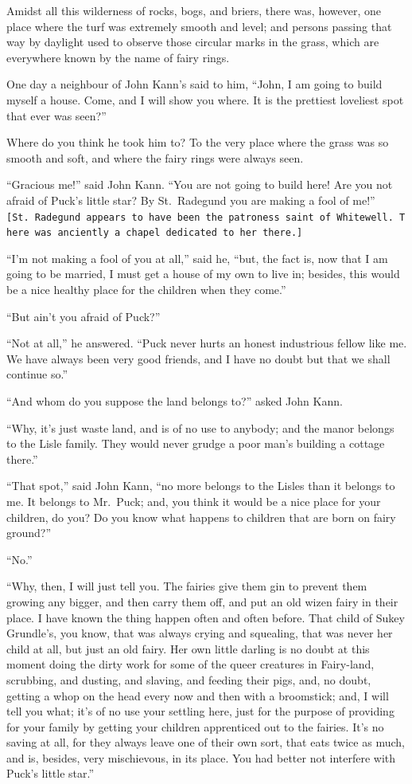 \documentclass[
  12pt,
  a5paper,
  twoside]{book}
\let\oldtexttt\texttt        %
\renewcommand{\texttt}[1]{{\footnotesize\oldtexttt{#1}}}
\begin{document}
Amidst all this wilderness of rocks, bogs, and briers, there was,
however, one place where the turf was extremely smooth and level; and
persons passing that way by daylight used to observe those circular
marks in the grass, which are everywhere known by the name of fairy
rings.

One day a neighbour of John Kann's said to him, ``John, I am going to
build myself a house. Come, and I will show you where. It is the
prettiest loveliest spot that ever was seen?''

Where do you think he took him to? To the very place where the grass was
so smooth and soft, and where the fairy rings were always seen.

``Gracious me!'' said John Kann. ``You are not going to build here! Are
you not afraid of Puck's little star? By St.~Radegund you are making a
fool of me!''
\texttt{{[}St.\ Radegund\ appears\ to\ have\ been\ the\ patroness\ saint\ of\ Whitewell.\ There\ was\ anciently\ a\ chapel\ dedicated\ to\ her\ there.{]}}

``I'm not making a fool of you at all,'' said he, ``but, the fact is,
now that I am going to be married, I must get a house of my own to live
in; besides, this would be a nice healthy place for the children when
they come.''

``But ain't you afraid of Puck?''

``Not at all,'' he answered. ``Puck never hurts an honest industrious
fellow like me. We have always been very good friends, and I have no
doubt but that we shall continue so.''

``And whom do you suppose the land belongs to?'' asked John Kann.

``Why, it's just waste land, and is of no use to anybody; and the manor
belongs to the Lisle family. They would never grudge a poor man's
building a cottage there.''

``That spot,'' said John Kann, ``no more belongs to the Lisles than it
belongs to me. It belongs to Mr.~Puck; and, you think it would be a nice
place for your children, do you? Do you know what happens to children
that are born on fairy ground?''

``No.''

``Why, then, I will just tell you. The fairies give them gin to prevent
them growing any bigger, and then carry them off, and put an old wizen
fairy in their place. I have known the thing happen often and often
before. That child of Sukey Grundle's, you know, that was always crying
and squealing, that was never her child at all, but just an old fairy.
Her own little darling is no doubt at this moment doing the dirty work
for some of the queer creatures in Fairy-land, scrubbing, and dusting,
and slaving, and feeding their pigs, and, no doubt, getting a whop on
the head every now and then with a broomstick; and, I will tell you
what; it's of no use your settling here, just for the purpose of
providing for your family by getting your children apprenticed out to
the fairies. It's no saving at all, for they always leave one of their
own sort, that eats twice as much, and is, besides, very mischievous, in
its place. You had better not interfere with Puck's little star.''
\end{document}

